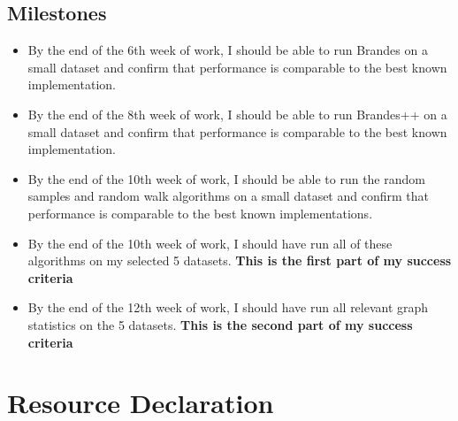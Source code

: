 \documentclass[a4paper,12pt]{article}
\begin{document}
\subsection{Milestones}
\begin{itemize}
\item By the end of the 6th week of work, I should be able to run Brandes \cite{doi:10.1080/0022250X.2001.9990249} on a small dataset and confirm that performance is comparable to the best known implementation.
\item By the end of the 8th week of work, I should be able to run Brandes++ \cite{erdos2015divideandconquer} on a small dataset and confirm that performance is comparable to the best known implementation.
\item By the end of the 10th week of work, I should be able to run the random samples \cite{inproceedings} and random walk \cite{NEWMAN200539} algorithms on a small dataset and confirm that performance is comparable to the best known implementations.
\item By the end of the 10th week of work, I should have run all of these algorithms on my selected 5 datasets. \textbf{This is the first part of my success criteria} 
\item By the end of the 12th week of work, I should have run all relevant graph statistics on the 5 datasets. \textbf{This is the second part of my success criteria}
\end{itemize}
\section{Resource Declaration}
\end{document}
